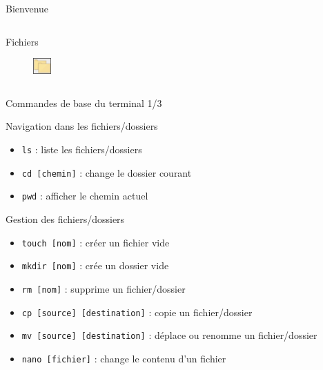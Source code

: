 \documentclass[aspectratio=169,xcolor=dvipsnames]{beamer}
\begin{document}
\begin{frame}{Bienvenue}
\begin{columns}[c]
\begin{center}
            Fichiers
            \begin{figure}
                \includegraphics[width=0.7\textwidth]{1/fichiers.png}
            \end{figure} 
        \end{center}

    \end{columns}
\end{frame}


\begin{frame}{Commandes de base du terminal 1/3}

    Navigation dans les fichiers/dossiers
    \begin{itemize}
        \item \texttt{ls} : liste les fichiers/dossiers
        \item \texttt{cd [chemin]} : change le dossier courant
        \item \texttt{pwd} : afficher le chemin actuel
    \end{itemize}

    Gestion des fichiers/dossiers
    \begin{itemize}
        \item \texttt{touch [nom]} : créer un fichier vide
        \item \texttt{mkdir [nom]} : crée un dossier vide
        \item \texttt{rm [nom]} : supprime un fichier/dossier
        \item \texttt{cp [source] [destination]} : copie un fichier/dossier
        \item \texttt{mv [source] [destination]} : déplace ou renomme un fichier/dossier
        \item \texttt{nano [fichier]} : change le contenu d'un fichier
    \end{itemize}
    
\end{frame}
\end{document}
